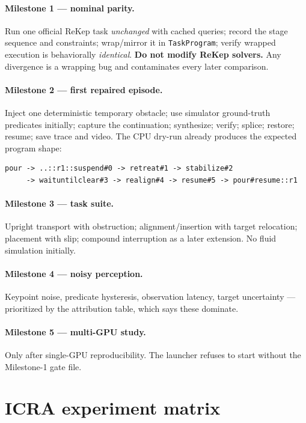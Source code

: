 \documentclass[11pt]{article}
\begin{document}
\paragraph{Milestone 1 --- nominal parity.} Run one official ReKep task
\emph{unchanged} with cached queries; record the stage sequence and constraints;
wrap/mirror it in \texttt{TaskProgram}; verify wrapped execution is behaviorally
\emph{identical}. \textbf{Do not modify ReKep solvers.} Any divergence is a
wrapping bug and contaminates every later comparison.

\paragraph{Milestone 2 --- first repaired episode.} Inject one deterministic
temporary obstacle; use simulator ground-truth predicates initially; capture the
continuation; synthesize; verify; splice; restore; resume; save trace and video.
The CPU dry-run already produces the expected program shape:
\begin{lstlisting}
pour -> ..::r1::suspend#0 -> retreat#1 -> stabilize#2
     -> waituntilclear#3 -> realign#4 -> resume#5 -> pour#resume::r1
\end{lstlisting}

\paragraph{Milestone 3 --- task suite.} Upright transport with obstruction;
alignment/insertion with target relocation; placement with slip; compound
interruption as a later extension. No fluid simulation initially.

\paragraph{Milestone 4 --- noisy perception.} Keypoint noise, predicate
hysteresis, observation latency, target uncertainty --- prioritized by the
attribution table, which says these dominate.

\paragraph{Milestone 5 --- multi-GPU study.} Only after single-GPU
reproducibility. The launcher refuses to start without the Milestone-1 gate file.

\section{ICRA experiment matrix}
\end{document}
